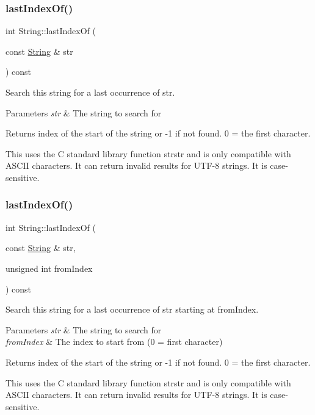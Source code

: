 \subsubsection{\texorpdfstring{last\+Index\+Of()}{lastIndexOf()}\hspace{0.1cm}{\footnotesize\ttfamily [3/4]}}
{\footnotesize\ttfamily int String\+::last\+Index\+Of (\begin{DoxyParamCaption}\item[{const \hyperlink{class_string}{String} \&}]{str }\end{DoxyParamCaption}) const}



Search this string for a last occurrence of str. 


\begin{DoxyParams}{Parameters}
{\em str} & The string to search for\\
\hline
\end{DoxyParams}
\begin{DoxyReturn}{Returns}
index of the start of the string or -\/1 if not found. 0 = the first character.
\end{DoxyReturn}
This uses the C standard library function strstr and is only compatible with A\+S\+C\+II characters. It can return invalid results for U\+T\+F-\/8 strings. It is case-\/sensitive. \mbox{\label{class_string_a08e7c60202cc42fe4731b52c0c5cd80f}} 
\subsubsection{\texorpdfstring{last\+Index\+Of()}{lastIndexOf()}\hspace{0.1cm}{\footnotesize\ttfamily [4/4]}}
{\footnotesize\ttfamily int String\+::last\+Index\+Of (\begin{DoxyParamCaption}\item[{const \hyperlink{class_string}{String} \&}]{str,  }\item[{unsigned int}]{from\+Index }\end{DoxyParamCaption}) const}



Search this string for a last occurrence of str starting at from\+Index. 


\begin{DoxyParams}{Parameters}
{\em str} & The string to search for\\
\hline
{\em from\+Index} & The index to start from (0 = first character)\\
\hline
\end{DoxyParams}
\begin{DoxyReturn}{Returns}
index of the start of the string or -\/1 if not found. 0 = the first character.
\end{DoxyReturn}
This uses the C standard library function strstr and is only compatible with A\+S\+C\+II characters. It can return invalid results for U\+T\+F-\/8 strings. It is case-\/sensitive. \mbox{\label{class_string_a21691d4bac5ec852977018fef6fb9c8a}} 
